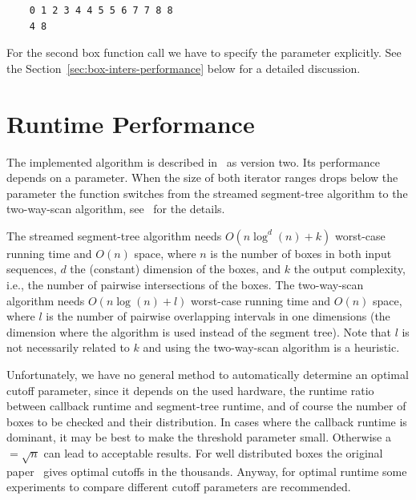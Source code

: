 \begin{verbatim}
    0 1 2 3 4 4 5 5 6 7 7 8 8 
    4 8 
\end{verbatim}

For the second box  function call we have to specify the
 parameter explicitly. See the
Section~\ref{sec:box-inters-performance} below for a detailed
discussion.



\section{Runtime Performance\label{sec:box-inters-performance}}

The implemented algorithm is described in~\cite{cgal:ze-fsbi-02} as
version two.  Its performance depends on a  parameter.
When the size of both iterator ranges drops below the 
parameter the function switches from the streamed segment-tree
algorithm to the two-way-scan algorithm, see~\cite{cgal:ze-fsbi-02}
for the details.

The streamed segment-tree algorithm needs $O(n \log^d (n) + k)$
worst-case running time and $O(n)$ space, where $n$ is the number of
boxes in both input sequences, $d$ the (constant) dimension of the
boxes, and $k$ the output complexity, i.e., the number of pairwise
intersections of the boxes. The two-way-scan algorithm needs $O(n \log
(n) + l)$ worst-case running time and $O(n)$ space, where $l$ is the
number of pairwise overlapping intervals in one dimensions (the
dimension where the algorithm is used instead of the segment tree).
Note that $l$ is not necessarily related to $k$ and using the
two-way-scan algorithm is a heuristic.

Unfortunately, we have no general method to automatically determine an
optimal cutoff parameter, since it depends on the used hardware, the
runtime ratio between callback runtime and segment-tree runtime, and
of course the number of boxes to be checked and their distribution. In
cases where the callback runtime is dominant, it may be best to make
the threshold parameter small. Otherwise a $=\sqrt{n}$ can
lead to acceptable results. For well distributed boxes the original
paper~\cite{cgal:ze-fsbi-02} gives optimal cutoffs in the thousands.
Anyway, for optimal runtime some experiments to compare different
cutoff parameters are recommended.

